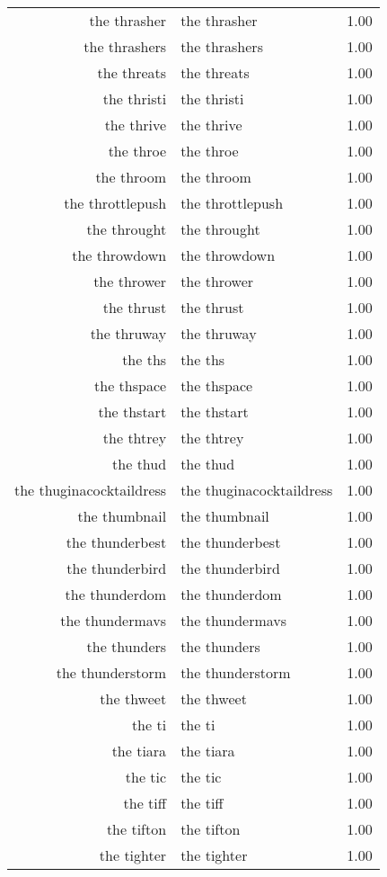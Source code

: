 \begin{table}[ht]
\begin{tabular}{rlr}
  the thrasher & the thrasher & 1.00 \\ 
  the thrashers & the thrashers & 1.00 \\ 
  the threats & the threats & 1.00 \\ 
  the thristi & the thristi & 1.00 \\ 
  the thrive & the thrive & 1.00 \\ 
  the throe & the throe & 1.00 \\ 
  the throom & the throom & 1.00 \\ 
  the throttlepush & the throttlepush & 1.00 \\ 
  the throught & the throught & 1.00 \\ 
  the throwdown & the throwdown & 1.00 \\ 
  the thrower & the thrower & 1.00 \\ 
  the thrust & the thrust & 1.00 \\ 
  the thruway & the thruway & 1.00 \\ 
  the ths & the ths & 1.00 \\ 
  the thspace & the thspace & 1.00 \\ 
  the thstart & the thstart & 1.00 \\ 
  the thtrey & the thtrey & 1.00 \\ 
  the thud & the thud & 1.00 \\ 
  the thuginacocktaildress & the thuginacocktaildress & 1.00 \\ 
  the thumbnail & the thumbnail & 1.00 \\ 
  the thunderbest & the thunderbest & 1.00 \\ 
  the thunderbird & the thunderbird & 1.00 \\ 
  the thunderdom & the thunderdom & 1.00 \\ 
  the thundermavs & the thundermavs & 1.00 \\ 
  the thunders & the thunders & 1.00 \\ 
  the thunderstorm & the thunderstorm & 1.00 \\ 
  the thweet & the thweet & 1.00 \\ 
  the ti & the ti & 1.00 \\ 
  the tiara & the tiara & 1.00 \\ 
  the tic & the tic & 1.00 \\ 
  the tiff & the tiff & 1.00 \\ 
  the tifton & the tifton & 1.00 \\ 
  the tighter & the tighter & 1.00 \\ 

\end{tabular}
\end{table}
